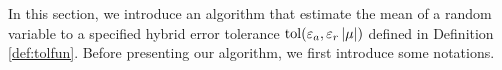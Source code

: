 \documentclass{iitthesis}
\theoremstyle{definition}
\begin{document}
In this section, we introduce an algorithm that estimate the mean of a random variable to a specified hybrid error tolerance $\operatorname{tol}(\varepsilon_a, \varepsilon_r\left \lvert \mu \right \rvert)$ defined in Definition \ref{def:tolfun}. Before presenting our algorithm, we first introduce some notations. 
\end{document}
